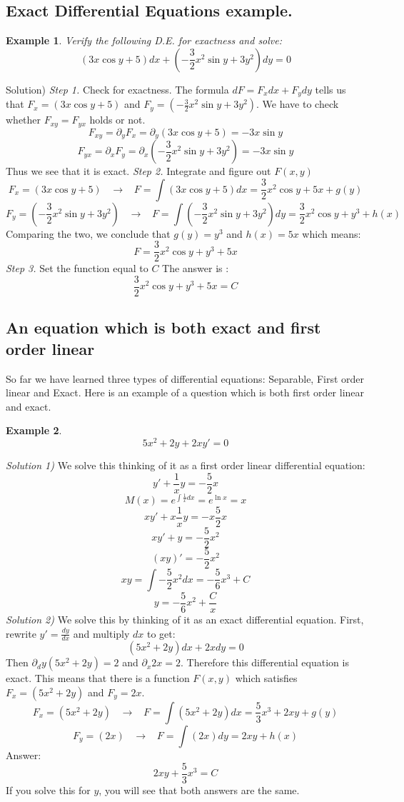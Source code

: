 \documentclass[12pt]{report}
\newtheorem{ex}{Example}[section]
\begin{document}
\subsection*{Exact Differential Equations example. }
\begin{ex}
Verify the following D.E. for exactness and solve:
$$(3x \cos y + 5) dx + \left(-\frac{3}{2} x^2 \sin y + 3y^2\right) dy = 0$$
\end{ex}
Solution)
\textit{Step 1.} Check for exactness.
The formula $dF= F_x dx + F_y dy$ tells us that $F_x = (3x \cos y + 5) $ and $F_y = (-\frac{3}{2} x^2 \sin y + 3y^2)$. We have to check whether $F_{xy} = F_{yx}$ holds or not.
$$F_{xy} = \partial_y F_x = \partial_y (3x \cos y + 5)  = -3x \sin y $$
$$F_{yx} = \partial_x F_y = \partial_x \left(-\frac{3}{2} x^2 \sin y + 3y^2\right) = -3x \sin y $$
Thus we see that it is exact.
\textit{Step 2.} Integrate and figure out $F(x,y)$
$$F_x = (3x \cos y + 5) \; \; \; \rightarrow \; \; \; F= \int (3x \cos y + 5) dx = \frac{3}{2} x^2 \cos y + 5x +g(y)$$
$$F_y = \left(-\frac{3}{2} x^2 \sin y + 3y^2\right)\; \; \; \rightarrow \; \; \; F= \int \left(-\frac{3}{2} x^2 \sin y + 3y^2\right) dy = \frac{3}{2} x^2 \cos y + y^3+ h(x)$$
Comparing the two, we conclude that $g(y)=y^3$ and $h(x)=5x$ which means:
$$F = \frac{3}{2} x^2 \cos y + y^3+ 5x $$
\textit{Step 3.} Set the function equal to $C$
The answer is :
$$\frac{3}{2} x^2 \cos y + y^3+ 5x =C $$

\subsection*{An equation which is both exact and first order linear}
So far we have learned three types of differential equations: Separable, First order linear and Exact. Here is an example of a question which is both first order linear and exact.
\begin{ex}
$$5x^2 +2y + 2xy' = 0$$
\end{ex}
\textit{Solution 1)} We solve this thinking of it as a first order linear differential equation:
$$ y' + \frac{1}{x} y = -\frac{5}{2} x $$
$$M(x) = e^{\int \frac{1}{x} dx} = e^{\ln x } = x$$
$$ x y' + x \frac{1}{x} y = -x \frac{5}{2} x $$
$$ xy' + y = -\frac{5}{2} x^2 $$
$$ (xy)' = -\frac{5}{2} x^2 $$
$$ xy = \int -\frac{5}{2} x^2 dx = -\frac{5}{6} x^3+ C$$
$$ y = -\frac{5}{6} x^2 + \frac{C}{x}$$
\textit{Solution 2)} We solve this by thinking of it as an exact differential equation.
First, rewrite $y' = \frac{dy}{dx}$ and multiply $dx$ to get:
$$(5x^2+2y)dx + 2x dy =0$$
Then $\partial_dy  (5x^2+2y) = 2$ and $\partial_x 2x = 2$. Therefore this differential equation is exact.
This means that there is a function $F(x,y)$ which satisfies $F_x = (5x^2+2y)$ and $F_y = 2x $.
$$F_x = (5x^2+2y) \; \; \; \rightarrow \; \; \; F= \int (5x^2+2y) dx = \frac{5}{3} x^3 +2xy+g(y)$$
$$F_y = (2x)\; \; \; \rightarrow \; \; \; F= \int (2x) dy =  2xy + h(x)$$
Answer:
$$ 2xy + \frac{5}{3} x^3 =C $$
If you solve this for $y$, you will see that both answers are the same.
\end{document}
